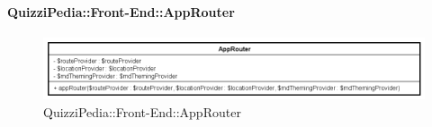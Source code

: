 
	\paragraph{QuizziPedia::Front-End::AppRouter}
	
	\label{QuizziPedia::Front-End::AppRouter}
	
	\begin{figure}[ht]
		\centering
		\includegraphics[scale=0.5,keepaspectratio]{UML/Classi/Front-End/QuizziPedia_Front-end_AppRouter.png}
		\caption{QuizziPedia::Front-End::AppRouter}
	\end{figure} \FloatBarrier
	
